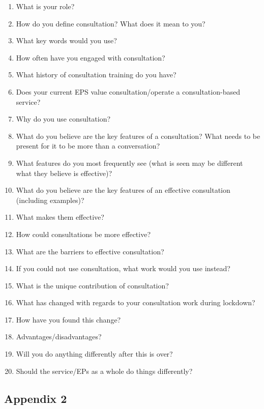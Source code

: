 \documentclass[
]{article}
\providecommand{\tightlist}{%
  \setlength{\itemsep}{0pt}\setlength{\parskip}{0pt}}
\begin{document}
\begin{enumerate}
\def\labelenumi{\arabic{enumi})}
\tightlist
\item
  What is your role?
\item
  How do you define consultation? What does it mean to you?
\item
  What key words would you use?
\item
  How often have you engaged with consultation?
\item
  What history of consultation training do you have?
\item
  Does your current EPS value consultation/operate a consultation-based
  service?
\item
  Why do you use consultation?
\item
  What do you believe are the key features of a consultation? What needs
  to be present for it to be more than a conversation?
\item
  What features do you most frequently see (what is seen may be
  different what they believe is effective)?
\item
  What do you believe are the key features of an effective consultation
  (including examples)?
\item
  What makes them effective?
\item
  How could consultations be more effective?
\item
  What are the barriers to effective consultation?
\item
  If you could not use consultation, what work would you use instead?
\item
  What is the unique contribution of consultation?
\item
  What has changed with regards to your consultation work during
  lockdown?
\item
  How have you found this change?
\item
  Advantages/disadvantages?
\item
  Will you do anything differently after this is over?
\item
  Should the service/EPs as a whole do things differently?
\end{enumerate}

\hypertarget{appendix-2}{%
\subsection{Appendix 2}\label{appendix-2}}
\end{document}
